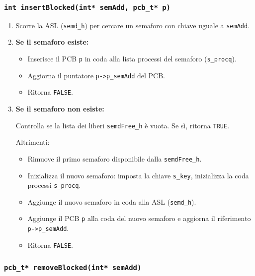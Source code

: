 \documentclass[a4paper,12pt]{article}
\begin{document}
\subsubsection{\texttt{int insertBlocked(int* semAdd, pcb\_t* p)}}


\begin{enumerate}
    \item Scorre la ASL (\texttt{semd\_h}) per cercare un semaforo con chiave uguale a \texttt{semAdd}.
    \item \textbf{Se il semaforo esiste:}
    \begin{itemize}
        \item Inserisce il PCB \texttt{p} in coda alla lista processi del semaforo (\texttt{s\_procq}).
        \item Aggiorna il puntatore \texttt{p->p\_semAdd} del PCB.
        \item Ritorna \texttt{FALSE}.
    \end{itemize}
    \item \textbf{Se il semaforo non esiste:}

    Controlla se la lista dei liberi \texttt{semdFree\_h} è vuota. Se sì, ritorna \texttt{TRUE}.

    Altrimenti: 
    \begin{itemize}
        
        \item Rimuove il primo semaforo  disponibile dalla \texttt{semdFree\_h}.
        \item Inizializza il nuovo semaforo: imposta la chiave \texttt{s\_key}, inizializza la coda processi \texttt{s\_procq}.
        \item Aggiunge il nuovo semaforo in coda alla ASL (\texttt{semd\_h}).
        \item Aggiunge il PCB \texttt{p} alla coda del nuovo semaforo e aggiorna il riferimento \texttt{p->p\_semAdd}.
        \item Ritorna \texttt{FALSE}.
    \end{itemize}
\end{enumerate}

\subsubsection{\texttt{pcb\_t* removeBlocked(int* semAdd)}}
\end{document}
